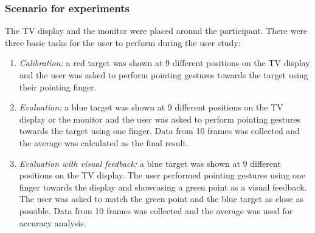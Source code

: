 \subsubsection{Scenario for experiments}
The TV display and the monitor were placed around the participant. There were three basic tasks for the user to perform during the user study:
\begin{enumerate}[label=(\Alph*)]
	\item \label{task:calib} \textit{Calibration:} a red target was shown at 9 different positions on the TV display and the user was asked to perform pointing gestures towards the target using their pointing finger.
	\item \label{task:pointEvaluation}\textit{Evaluation:} a blue target was shown at 9 different positions on the TV display or the monitor and the user was asked to perform pointing gestures towards the target using one finger. Data from 10 frames was collected and the average was calculated as the final result. 
	\item \label{task:PointWithFeedback}\textit{Evaluation with visual feedback:} a blue target was shown at 9 different positions on the TV display. The user performed pointing gestures using one finger towards the display and showcasing a green point as a visual feedback. The user was asked to match the green point and the blue target as close as possible. Data from 10 frames was collected and the average was used for accuracy analysis.
	
\end{enumerate}

